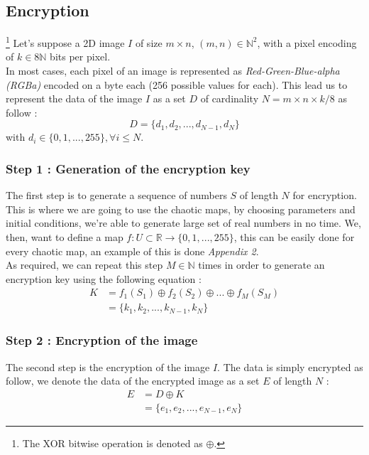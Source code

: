 \subsection{Encryption}
\footnote{The XOR bitwise operation is denoted as $\oplus$.}
Let's suppose a 2D image $I$ of size $m \times n$, $(m, n) \in \mathbb{N}^2$, with a pixel encoding of $k \in 8\mathbb{N}$ bits per pixel.  \\
In most cases, each pixel of an image is represented as \textit{Red-Green-Blue-alpha (RGBa)} encoded on a byte each (256 possible values for each). 
This lead us to represent the data of the image $I$ as a set $D$ of cardinality $N=m \times n \times k/8$ as follow : 
\begin{equation*}
	D = \{d_1, d_2, ... , d_{N-1}, d_{N}\}
\end{equation*}
with $d_i \in \{0, 1, ..., 255\}, \forall i \leq N$.

\subsubsection{Step 1 : Generation of the encryption key}
The first step is to generate a sequence of numbers $S$ of length $N$ for encryption. This is where we are going to use the chaotic maps, by choosing parameters and initial conditions, we're able to generate large set of real numbers in no time.
We, then, want to define a map $f: U \subset \mathbb{R} \rightarrow \{0,1,...,255\}$, this can be easily done for every chaotic map, an example of this is done \textit{Appendix 2}. \\
As required, we can repeat this step $M \in \mathbb{N}$ times in order to generate an encryption key using the following equation :
\begin{align*}
	K &= f_1(S_1) \oplus f_2(S_2) \oplus ... \oplus f_M(S_M) \\
	&= \{ k_1, k_2, ..., k_{N-1}, k_{N}\}
\end{align*}


\subsubsection{Step 2 : Encryption of the image}
The second step is the encryption of the image $I$. The data is simply encrypted as follow, we denote the data of the encrypted image as a set $E$ of length $N$ :
\vspace{-0.3em}
\begin{align*}
	E &= D \oplus K \\
	&= \{e_1, e_2,..., e_{N-1}, e_N\}
\end{align*}

